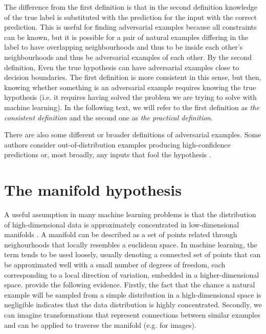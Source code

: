 \documentclass[conference,compsoc]{IEEEtran}
\begin{document}
The difference from the first definition is that in the second definition knowledge of the true label is substituted with the prediction for the input with the correct prediction. This is useful for finding adversarial examples because all constraints can be known, but it is possible for a pair of natural examples differing in the label to have overlapping neighbourhoods and thus to be inside each other's neighbourhoods and thus be adversarial examples of each other. By the second definition, Even the true hypothesis can have adversarial examples close to decision boundaries. The first definition is more consistent in this sense, but then, knowing whether something is an adversarial example requires knowing the true hypothesis (i.e. it requires having solved the problem we are trying to solve with machine learning). In the following text, we will refer to the first definition as \textit{the consistent definition} and the second one as \textit{the practical definition}.

There are also some different or broader definitions of adversarial examples. Some authors consider out-of-distribution examples producing high-confidence predictions \citep{Gal:2018:SCIMHNAETESBNN} or, most broadly, any inputs that fool the hypothesis \citep{Brown:2018:UAE}.


\section{The manifold hypothesis}

A useful assumption in many machine learning problems is that the distribution of high-dimensional data is approximately concentrated in low-dimensional manifolds \citep{Goodfellow:2016:DL}. A manifold can be described as a set of points related through neighourhoods that locally resembles a euclidean space. In machine learning, the term tends to be used loosely, usually denoting a connected set of points that can be approximated well with a small number of degrees of freedom, each corresponding to a local direction of variation, embedded in a higher-dimensional space. 
\citep{Goodfellow:2016:DL} provide the following evidence. Firstly, the fact that the chance a natural example will be sampled from a simple distribution in a high-dimensional space is negligible indicates that the data distribution is highly concentrated. Secondly, we can imagine transformations that represent connections between similar examples and can be applied to traverse the manifold (e.g. for images).
\end{document}
